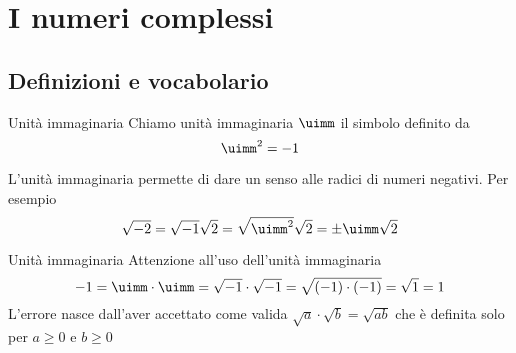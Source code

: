 \chapter{I numeri complessi}
\label{cha:INumeriComplessi}
\section{Definizioni e vocabolario}
\label{sec:NumCompDefinizioniVocabolario}
\begin{definizionet}{Unità immaginaria}{}
	Chiamo unità immaginaria $\uimm$ il simbolo definito da \[\uimm^2=-1\]  
\end{definizionet}
L'unità immaginaria permette di dare un senso alle radici di numeri negativi. Per esempio \[\sqrt{-2}=\sqrt{-1}\sqrt{2}=\sqrt{\uimm^2}\sqrt{2}=\pm\uimm\sqrt{2}\]
\begin{cesempiot}{Unità immaginaria}{}
Attenzione all'uso dell'unità immaginaria
\[-1=\uimm\cdot\uimm=\sqrt{-1}\cdot\sqrt{-1}=\sqrt{(-1)\cdot(-1)}=\sqrt{1}=1 \]L'errore nasce dall'aver accettato come valida $\sqrt{a}\cdot\sqrt{b}=\sqrt{ab}$ che è definita solo per $a\geq 0$ e $b\geq 0$
\end{cesempiot}
